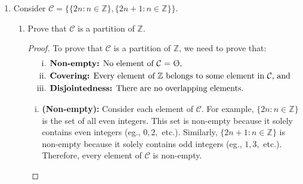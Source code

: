 \documentclass{article}
\begin{document}
\begin{enumerate}
\begin{enumerate}
\begin{proof}
                        \end{proof}

    			\item Find the equivalence relation corresponding to $\mathcal{C}$.
                        \\\\\quad The equivalence relation corresponding to $\mathcal{C}$ is: 
                        \[
                            a \sim b \text{ iff } a \text{ and } b \text{ belong to the same element in } \mathcal{C}\text{, that is}
                        \]
                        \[
                            a \sim b \text{ iff } \{ a, b \} \subseteq \{ n\in\mathbb{Z}:n < 0 \} \text{, or } \{ a, b \} \subseteq \{ 0 \} \text{, or } \{ a, b \} \subseteq \{ n\in\mathbb{Z}:n > 0 \}.
                        \]
                        
    		\end{enumerate}

    	\item Consider $\mathcal{C} = \{ \{ 2n : n \in \mathbb{Z} \}, \{ 2n+1 : n \in \mathbb{Z} \} \}$.
    		\begin{enumerate}

    			\item Prove that $\mathcal{C}$ is a partition of $\mathbb{Z}$.
                        \begin{proof}
                            To prove that $\mathcal{C}$ is a partition of $\mathbb{Z}$, we need to prove that:\
                                \begin{align*}
                                    \text{i. }   & \text{\textbf{Non-empty:} No element of $\mathcal{C}$ = \O,}  \\
                                    \text{ii. }  & \text{\textbf{Covering:} Every element of $\mathbb{Z}$ belongs to some element in $\mathcal{C}$, and} \\
                                    \text {iii. }& \text{\textbf{Disjointedness:} There are no overlapping elements.}
                                \end{align*}
                                
                            \begin{enumerate}[i.]
                                \item\textbf{(Non-empty):} 
                                    Consider each element of $\mathcal{C}$. For example, $\{ 2n : n \in \mathbb{Z} \}$ is the set of all even integers. This set is non-empty because it solely contains even integers (eg., $0, 2,$ etc.). Similarly, $\{ 2n+1 : n \in \mathbb{Z} \}$ is non-empty because it solely contains odd integers (eg., $1, 3,$ etc.). Therefore, every element of $\mathcal{C}$ is non-empty. \\ 


\end{enumerate}
\end{proof}
\end{enumerate}
\end{enumerate}
\end{document}
